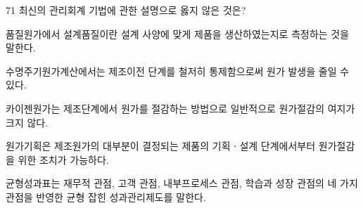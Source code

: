 \begin{question}{71}
최신의 관리회계 기법에 관한 설명으로 옳지 않은 것은?
\begin{choices}
  \item 품질원가에서 설계품질이란 설계 사양에 맞게 제품을 생산하였는지로 측정하는 것을 말한다.
  \item 수명주기원가계산에서는 제조이전 단계를 철저히 통제함으로써 원가 발생을 줄일 수 있다.
  \item 카이젠원가는 제조단계에서 원가를 절감하는 방법으로 일반적으로 원가절감의 여지가 크지 않다.
  \item 원가기획은 제조원가의 대부분이 결정되는 제품의 기획ㆍ설계 단계에서부터 원가절감을 위한 조치가 가능하다.
  \item 균형성과표는 재무적 관점, 고객 관점, 내부프로세스 관점, 학습과 성장 관점의 네 가지 관점을 반영한 균형 잡힌 성과관리제도를 말한다.
\end{choices}
\end{question}
